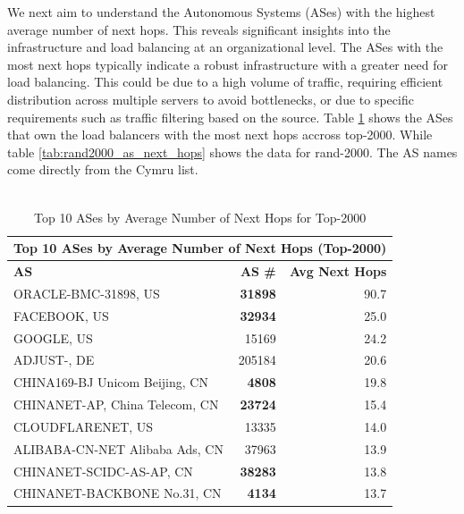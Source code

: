 \documentclass[12pt]{cwru_thesis}
\begin{document}
We next aim to understand the Autonomous Systems (ASes) with the highest average number of next hops.  This reveals significant insights into the infrastructure and load balancing at an organizational level.
The ASes with the most next hops typically indicate a robust infrastructure with a greater need for load balancing. This could be due to a high volume of traffic, requiring efficient distribution across multiple servers to avoid bottlenecks, or due to specific requirements such as traffic filtering based on the source. Table \ref{tab:top2000_as_next_hops} shows the ASes that own the load balancers with the most next hops accross top-2000. While table \ref{tab:rand2000_as_next_hops} shows the data for rand-2000. The AS names come directly from the Cymru list. \\
 \\
\begin{table}[h!]
    \centering
    \begin{tabularx}{\textwidth}{|X|r|r|}
        \hline
        \multicolumn{3}{|c|}{\textbf{Top 10 ASes by Average Number of Next Hops (Top-2000)}} \\
        \hline
        \textbf{AS} & \textbf{AS \#} & \textbf{Avg Next Hops} \\
        \hline
        ORACLE-BMC-31898, US & \textbf{31898} & 90.7 \\
        FACEBOOK, US & \textbf{32934} & 25.0 \\
        GOOGLE, US & 15169 & 24.2 \\
        ADJUST-, DE & 205184 & 20.6 \\
        CHINA169-BJ Unicom Beijing, CN & \textbf{4808} & 19.8 \\
        CHINANET-AP, China Telecom, CN & \textbf{23724} & 15.4 \\
        CLOUDFLARENET, US & 13335 & 14.0 \\
        ALIBABA-CN-NET Alibaba Ads, CN & 37963 & 13.9 \\
        CHINANET-SCIDC-AS-AP, CN & \textbf{38283} & 13.8 \\
        CHINANET-BACKBONE No.31, CN & \textbf{4134} & 13.7 \\
        \hline
    \end{tabularx}
    \caption{Top 10 ASes by Average Number of Next Hops for Top-2000}
    \label{tab:top2000_as_next_hops}
\end{table}\newpage
\end{document}
